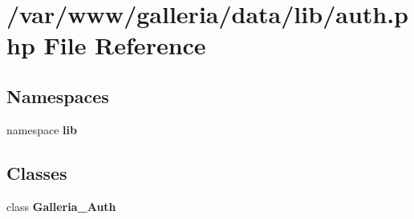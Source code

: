 \section{/var/www/galleria/data/lib/auth.php File Reference}
\label{auth_8php}
\subsection*{Namespaces}
\begin{CompactItemize}
\item 
namespace {\bf lib}
\end{CompactItemize}
\subsection*{Classes}
\begin{CompactItemize}
\item 
class {\bf Galleria\_\-Auth}
\end{CompactItemize}
